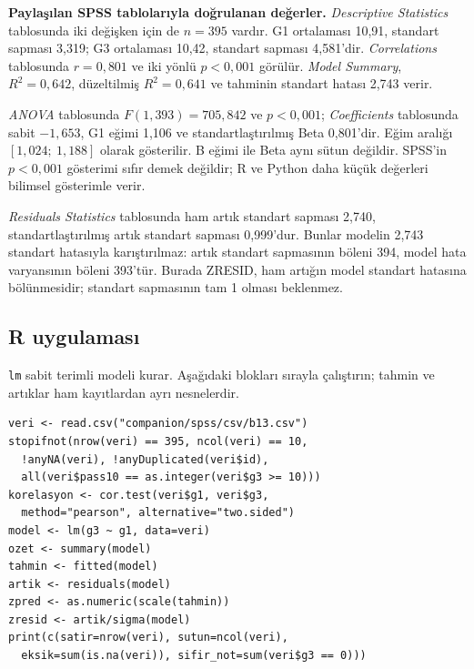 \begin{outputguidebox}
\textbf{Paylaşılan SPSS tablolarıyla doğrulanan değerler.}
\emph{Descriptive Statistics} tablosunda iki değişken için de
$n=395$ vardır. G1 ortalaması 10,91, standart sapması 3,319;
G3 ortalaması 10,42, standart sapması 4,581'dir.
\emph{Correlations} tablosunda $r=0{,}801$ ve iki yönlü
$p<0{,}001$ görülür. \emph{Model Summary}, $R^2=0{,}642$,
düzeltilmiş $R^2=0{,}641$ ve tahminin standart hatası 2,743 verir.

\emph{ANOVA} tablosunda $F(1,393)=705{,}842$ ve $p<0{,}001$;
\emph{Coefficients} tablosunda sabit $-1{,}653$, G1 eğimi
1,106 ve standartlaştırılmış Beta 0,801'dir. Eğim aralığı
$[1{,}024;\ 1{,}188]$ olarak gösterilir. B eğimi ile Beta
aynı sütun değildir. SPSS'in $p<0{,}001$ gösterimi sıfır demek
değildir; R ve Python daha küçük değerleri bilimsel gösterimle verir.

\emph{Residuals Statistics} tablosunda ham artık standart sapması
2,740, standartlaştırılmış artık standart sapması 0,999'dur.
Bunlar modelin 2,743 standart hatasıyla karıştırılmaz: artık
standart sapmasının böleni 394, model hata varyansının böleni
393'tür. Burada ZRESID, ham artığın model standart hatasına
bölünmesidir; standart sapmasının tam 1 olması beklenmez.
\end{outputguidebox}


\par\noindent\begin{minipage}{\linewidth}
\subsection{R uygulaması}
\label{sec:r-gercek-b13}

\texttt{lm} sabit terimli modeli kurar. Aşağıdaki blokları sırayla
çalıştırın; tahmin ve artıklar ham kayıtlardan ayrı nesnelerdir.

\begin{lstlisting}[style=prismR]
veri <- read.csv("companion/spss/csv/b13.csv")
stopifnot(nrow(veri) == 395, ncol(veri) == 10,
  !anyNA(veri), !anyDuplicated(veri$id),
  all(veri$pass10 == as.integer(veri$g3 >= 10)))
korelasyon <- cor.test(veri$g1, veri$g3,
  method="pearson", alternative="two.sided")
model <- lm(g3 ~ g1, data=veri)
ozet <- summary(model)
tahmin <- fitted(model)
artik <- residuals(model)
zpred <- as.numeric(scale(tahmin))
zresid <- artik/sigma(model)
print(c(satir=nrow(veri), sutun=ncol(veri),
  eksik=sum(is.na(veri)), sifir_not=sum(veri$g3 == 0)))
\end{lstlisting}
\end{minipage}\par

